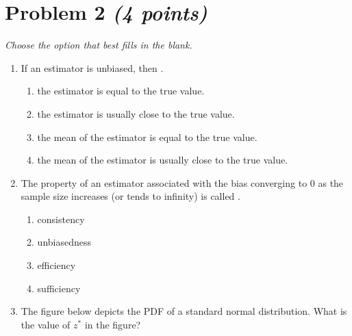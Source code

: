 \documentclass[11pt,twoside]{article}
\newcommand{\pts}[1]{\marginpar{ \small\hspace{0pt} \textit{[#1]} } }
\numberwithin{equation}{section}
\newcommand{\?}{\stackrel{?}{=}}
\begin{document}
\eject  

 \section*{Problem 2 \textit{(4 points)}}
{\it Choose the option that best fills in the blank.}
   \begin{enumerate}[\bf(a)]
   \item If an estimator is unbiased, then \underline{\hspace{60ex}}.\pts{1}

     \begin{enumerate}[\bf(i)]
     \item the estimator is equal to the true value.
     \item the estimator is usually close to the true value.
     \item the mean of the estimator is equal to the true value.
     \item the mean of the estimator is usually close to the true value.
     \end{enumerate}

   \item The property \pts{1} of an estimator associated with the bias converging to 0 as the sample size increases (or tends to infinity) is called \underline{\hspace{20ex}}.
     \begin{enumerate}[\bf(i)]
     \item consistency
     \item unbiasedness
     \item efficiency
     \item sufficiency
     \end{enumerate}

   \item The figure below depicts the PDF of a standard normal distribution. What is the value of $z^{*}$ in the figure? \pts{1}


\end{enumerate}
\end{document}
